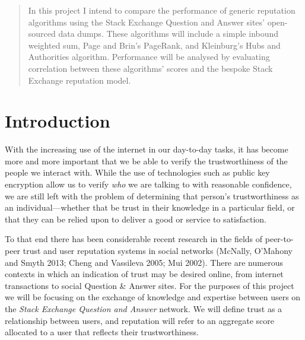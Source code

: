 \documentclass[]{final_report}
\begin{document}
\begin{abstract}

In this project I intend to compare the performance of generic reputation algorithms using the Stack Exchange Question and Answer sites' open-sourced data dumps. These algorithms will include a simple inbound weighted sum, Page and Brin's PageRank, and Kleinburg's Hubs and Authorities algorithm. Performance will be analysed by evaluating correlation between these algorithms' scores and the bespoke Stack Exchange reputation model.


\end{abstract}
\newpage



\chapter{Introduction}

With the increasing use of the internet in our day-to-day tasks, it has become more and more important that we be able to verify the trustworthiness of the people we interact with. While the use of technologies such as public key encryption allow us to verify \textsl{who} we are talking to with reasonable confidence, we are still left with the problem of determining that person's trustworthiness as an individual---whether that be trust in their knowledge in a particular field, or that they can be relied upon to deliver a good or service to satisfaction.

To that end there has been considerable recent research in the fields of peer-to-peer trust and user reputation systems in social networks (McNally, O'Mahony and Smyth 2013; Cheng and Vassileva 2005; Mui 2002). There are numerous contexts in which an indication of trust may be desired online, from internet transactions to social Question \& Answer sites. For the purposes of this project we will be focusing on the exchange of knowledge and expertise between users on the \textsl{Stack Exchange Question and Answer} network. We will define trust as a relationship between users, and reputation will refer to an aggregate score allocated to a user that reflects their trustworthiness.
\end{document}
